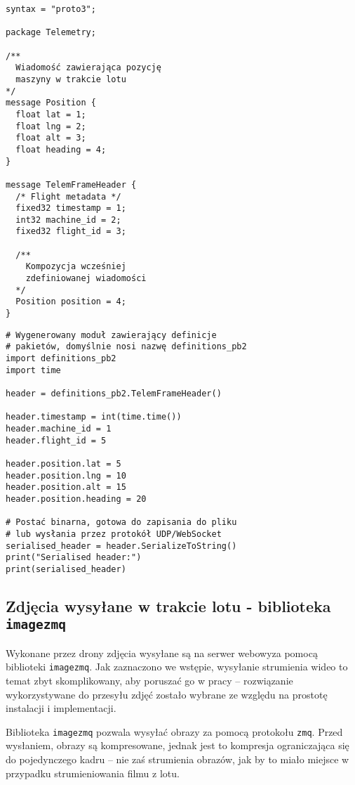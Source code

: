 \begin{lstlisting}[label=list:protobuf,caption=Przykład definicji pakietu \texttt{protobuf}, basicstyle=\footnotesize\ttfamily]
syntax = "proto3";

package Telemetry;

/**
  Wiadomość zawierająca pozycję
  maszyny w trakcie lotu
*/
message Position {
  float lat = 1;
  float lng = 2;
  float alt = 3;
  float heading = 4;
}

message TelemFrameHeader {
  /* Flight metadata */
  fixed32 timestamp = 1;
  int32 machine_id = 2;
  fixed32 flight_id = 3;

  /**
	Kompozycja wcześniej
	zdefiniowanej wiadomości 
  */
  Position position = 4;
}
\end{lstlisting}

\begin{lstlisting}[label=list:protobuf,caption=Przykład wykorzystania wygenerowanej implementacji pakietów w języku Python,basicstyle=\footnotesize\ttfamily]
# Wygenerowany moduł zawierający definicje
# pakietów, domyślnie nosi nazwę definitions_pb2
import definitions_pb2
import time

header = definitions_pb2.TelemFrameHeader()

header.timestamp = int(time.time())
header.machine_id = 1
header.flight_id = 5

header.position.lat = 5
header.position.lng = 10
header.position.alt = 15
header.position.heading = 20

# Postać binarna, gotowa do zapisania do pliku
# lub wysłania przez protokół UDP/WebSocket
serialised_header = header.SerializeToString()
print("Serialised header:")
print(serialised_header) 
\end{lstlisting}

\subsection{Zdjęcia wysyłane w trakcie lotu - biblioteka \texttt{imagezmq}}

Wykonane przez drony zdjęcia wysyłane są na serwer webowyza pomocą biblioteki
\texttt{imagezmq}. Jak zaznaczono we wstępie, wysyłanie strumienia wideo to
temat zbyt skomplikowany, aby poruszać go w pracy -- rozwiązanie wykorzystywane
do przesyłu zdjęć zostało wybrane ze względu na prostotę instalacji i implementacji.

Biblioteka \texttt{imagezmq} pozwala wysyłać obrazy za pomocą protokołu \texttt{zmq}.
Przed wysłaniem, obrazy są kompresowane, jednak jest to kompresja ograniczająca się do 
pojedynczego kadru -- nie zaś strumienia obrazów, jak by to miało miejsce w przypadku 
strumieniowania filmu z lotu.

